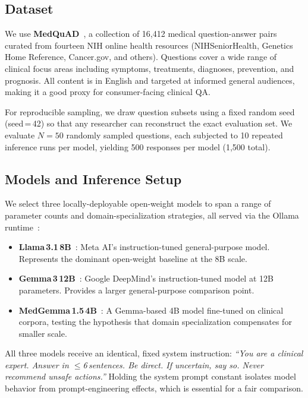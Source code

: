 \documentclass[11pt,twocolumn]{article}
\begin{document}
\subsection{Dataset}

We use \textbf{MedQuAD}~\cite{abacha2019mqa}, a collection of
16,412 medical question-answer pairs curated from fourteen NIH online
health resources (NIHSeniorHealth, Genetics Home Reference, Cancer.gov,
and others).
Questions cover a wide range of clinical focus areas including symptoms,
treatments, diagnoses, prevention, and prognosis.
All content is in English and targeted at informed general audiences,
making it a good proxy for consumer-facing clinical QA.

For reproducible sampling, we draw question subsets using a fixed
random seed (seed\,=\,42) so that any researcher can reconstruct the
exact evaluation set.
We evaluate $N{=}50$ randomly sampled questions, each subjected to
10 repeated inference runs per model, yielding 500 responses per
model (1,500 total).

\subsection{Models and Inference Setup}

We select three locally-deployable open-weight models to span a range
of parameter counts and domain-specialization strategies, all served
via the Ollama runtime~\cite{ollama}:

\begin{itemize}
  \item \textbf{Llama\,3.1\,8B}~\cite{dubey2024llama3}:
        Meta AI's instruction-tuned general-purpose model.
        Represents the dominant open-weight baseline at the 8B scale.
  \item \textbf{Gemma\,3\,12B}~\cite{team2024gemma}:
        Google DeepMind's instruction-tuned model at 12B parameters.
        Provides a larger general-purpose comparison point.
  \item \textbf{MedGemma\,1.5\,4B}~\cite{medgemma2024}:
        A Gemma-based 4B model fine-tuned on clinical corpora,
        testing the hypothesis that domain specialization compensates
        for smaller scale.
\end{itemize}

All three models receive an identical, fixed system instruction:
\textit{``You are a clinical expert. Answer in $\leq$6\,sentences.
Be direct. If uncertain, say so. Never recommend unsafe actions.''}
Holding the system prompt constant isolates model behavior from
prompt-engineering effects, which is essential for a fair comparison.
\end{document}
